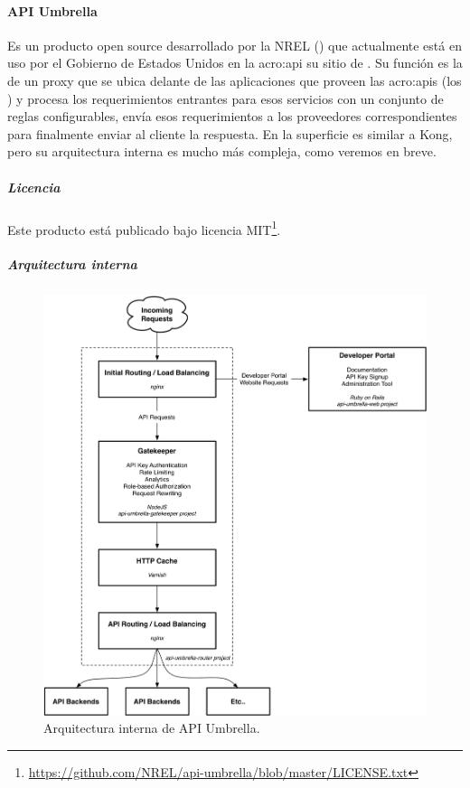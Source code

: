 \paragraph{API Umbrella}
\label{soa:tecnologias:api-umbrella}

Es un producto open source desarrollado por la NREL () que actualmente está en uso por el Gobierno de Estados Unidos en la \gls{acro:api} su sitio de . Su función es la de un proxy que se ubica delante de las aplicaciones que proveen las \glspl{acro:api} (los ) y procesa los requerimientos entrantes para esos servicios con un conjunto de reglas configurables, envía esos requerimientos a los proveedores correspondientes para finalmente enviar al cliente la respuesta. En la superficie es similar a Kong, pero su arquitectura interna es mucho más compleja, como veremos en breve.

\subparagraph{Licencia}

Este producto está publicado bajo licencia MIT\footnote{\url{https://github.com/NREL/api-umbrella/blob/master/LICENSE.txt}}.

\subparagraph{Arquitectura interna}

\begin{figure}
  \includegraphics[width=\linewidth]{src/images/02-capitulo-2/tecnologias/api-umbrella/api-umbrella-arq.png}
  \caption{Arquitectura interna de API Umbrella.}
  \label{fig:arquitectura-interna-api-umbrella}
\end{figure}

